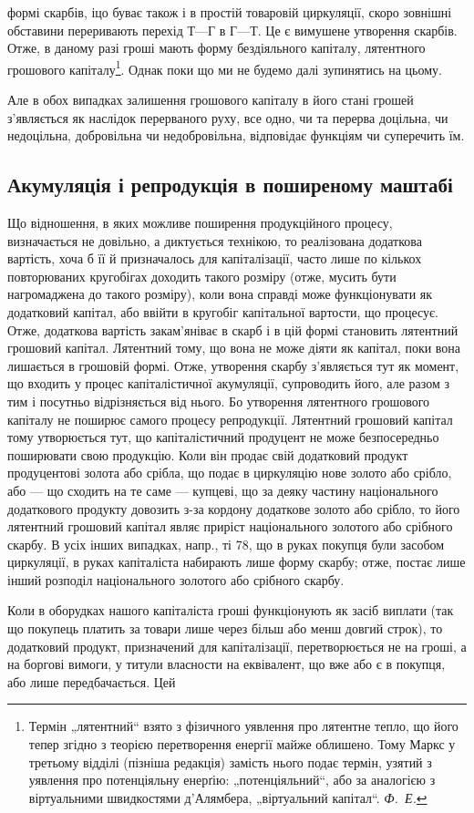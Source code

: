 \parcont{}  %
формі скарбів, іцо буває також і в простій товаровій циркуляції, скоро
зовнішні обставини переривають перехід $Т — Г$ в $Г — Т$. Це є вимушене
утворення скарбів. Отже, в даному разі гроші мають форму бездіяльного
капіталу, лятентного грошового капіталу\footnote{
Термін „лятентний“ взято з фізичного уявлення про лятентне тепло, що
його тепер згідно з теорією перетворення енергії майже облишено. Тому Маркс
у третьому відділі (пізніша редакція) замість нього подає термін, узятий з уявлення
про потенціяльну енерґію: „потенціяльний“, або за аналогією з віртуальними швидкостями
д’Алямбера, „віртуальний капітал“. \emph{Ф.~Е.}
}. Однак поки що ми не будемо
далі зупинятись на цьому.

Але в обох випадках залишення грошового капіталу в його стані
грошей з’являється як наслідок перерваного руху, все одно, чи та перерва
доцільна, чи недоцільна, добровільна чи недобровільна, відповідає функціям
чи суперечить їм.

\subsection{Акумуляція і репродукція в поширеному маштабі}

Що відношення, в яких можливе поширення продукційного процесу,
визначається не довільно, а диктується технікою, то реалізована додаткова
вартість, хоча б її й призначалось для капіталізації, часто лише по
кількох повторюваних кругобігах доходить такого розміру (отже, мусить
бути нагромаджена до такого розміру), коли вона справді може функціонувати
як додатковий капітал, або ввійти в кругобіг капітальної вартости,
що процесує. Отже, додаткова вартість закам’яніває в скарб і в цій
формі становить лятентний грошовий капітал. Лятентний тому, що вона не
може діяти як капітал, поки вона лишається в грошовій формі. Отже,
утворення скарбу з’являється тут як момент, що входить у процес капіталістичної
акумуляції, супроводить його, але разом з тим і посутньо
відрізняється від нього. Бо утворення лятентного грошового капіталу
не поширює самого процесу репродукції. Лятентний грошовий
капітал тому утворюється тут, що капіталістичний продуцент не може
безпосередньо поширювати свою продукцію. Коли він продає свій додатковий
продукт продуцентові золота або срібла, що подає в циркуляцію
нове золото або срібло, або — що сходить на те саме — купцеві, що
за деяку частину національного додаткового продукту довозить
з-за кордону додаткове золото або срібло, то його лятентний грошовий
капітал являє приріст національного золотого або срібного скарбу. В усіх
інших випадках, напр., ті 78, що в руках покупця були засобом
циркуляції, в руках капіталіста набирають лише форму скарбу;
отже, постає лише інший розподіл національного золотого або срібного
скарбу.

Коли в оборудках нашого капіталіста гроші функціонують як засіб виплати
(так що покупець платить за товари лише через більш або менш довгий
строк), то додатковий продукт, призначений для капіталізації, перетворюється
не на гроші, а на боргові вимоги, у титули власности
на еквівалент, що вже або є в покупця, або лише передбачається. Цей
\parbreak{}  %
